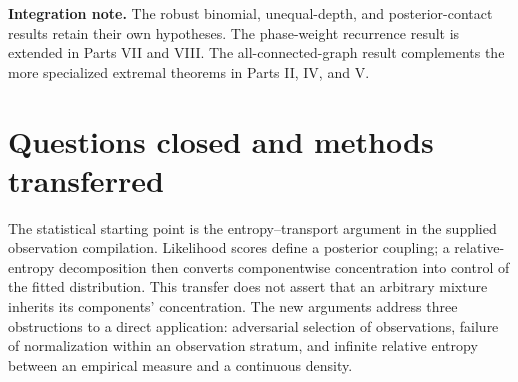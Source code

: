 \documentclass[11pt,a4paper]{article}
\theoremstyle{definition}
\theoremstyle{remark}
\numberwithin{equation}{section}
\begin{document}
\noindent\textbf{Integration note.} The robust binomial, unequal-depth, and posterior-contact results retain their own hypotheses. The phase-weight recurrence result is extended in Parts VII and VIII. The all-connected-graph result complements the more specialized extremal theorems in Parts II, IV, and V.
\clearpage

\section{Questions closed and methods transferred}

The statistical starting point is the entropy--transport argument in the
supplied observation compilation. Likelihood scores define a posterior
coupling; a relative-entropy decomposition then converts componentwise
concentration into control of the fitted distribution. This transfer does
not assert that an arbitrary mixture inherits its components' concentration.
The new arguments address three obstructions to a direct application:
adversarial selection of observations, failure of normalization within an
observation stratum, and infinite relative entropy between an empirical
measure and a continuous density.
\end{document}
